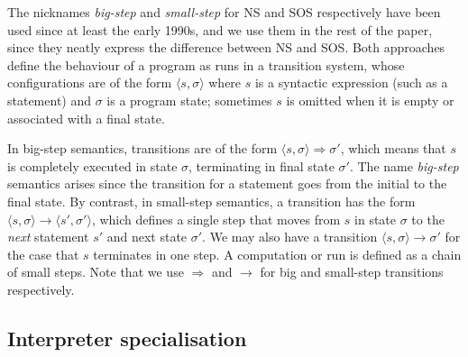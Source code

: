 \documentclass{llncs}
\begin{document}
The nicknames \emph{big-step} and \emph{small-step} for NS and SOS respectively have been used
since at least the early 1990s, and we use them in the rest of the paper, since they neatly
express the difference between NS and SOS.  Both approaches define the behaviour of a program
as runs in a transition system, whose configurations are of the form $\langle s, \sigma\rangle$ where $s$ is a
syntactic expression (such as a statement) and $\sigma$ is a program state; sometimes $s$ is omitted when it is empty
or associated with a final state.  

In big-step semantics, transitions are of the form $\langle s, \sigma\rangle \Rightarrow \sigma'$, 
which means that $s$ is completely executed in state $\sigma$, terminating in final state $\sigma'$.
The name \emph{big-step} semantics arises since the transition for a statement goes from the initial to the final state.  
%
By contrast, in small-step semantics, a transition has the form $\langle s, \sigma\rangle \rightarrow \langle s',\sigma'\rangle$, 
which defines a single step
that moves from $s$ in state $\sigma$ to the \emph{next} statement $s'$ and next state $\sigma'$. We may also have a transition
$\langle s, \sigma\rangle \rightarrow \sigma'$ for the case that $s$ terminates in one step.
A computation or run is defined as a 
chain of small steps.  Note that we use $\Rightarrow$ and $\rightarrow$ for big and small-step transitions respectively.

\subsection{Interpreter specialisation}
\end{document}
